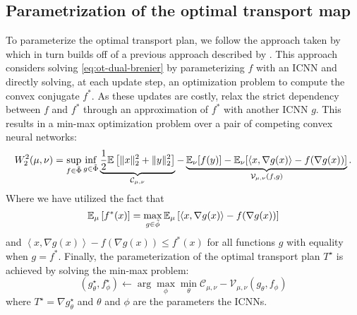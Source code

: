 \subsection{Parametrization of the optimal transport map}
To parameterize the optimal transport plan, we follow the approach taken by \citeauthor{makkuva2020} which 
in turn builds off of a previous approach described by \citet{taghvaei2019}.
This approach considers solving \eqref{eq:ot-dual-brenier} by parameterizing $f$ with an ICNN and directly solving, at each update step, an optimization problem to compute the convex conjugate $f^*$.
As these updates are costly, \citet{makkuva2020} relax the strict dependency between $f$ and $f^*$
through an approximation of $f^*$ with another ICNN $g$.
This results in a min-max optimization problem over a pair of competing convex neural networks:
\begin{equation}
  W_{2}^2(\mu, \nu)=\sup _{\substack{f \in \Tilde{\Phi}}} \inf _{g \in \Tilde{\Phi}}  \underbrace{\frac{1}{2}\mathbb{E}\left[\|x\|_{2}^{2}+\|y\|_{2}^{2}\right]}_{\mathcal{C}_{\mu, \nu}} - \underbrace{\mathbb{E}_{\nu}[f(y)]-\mathbb{E}_{\nu}[\langle x, \nabla g(x)\rangle-f(\nabla g(x))]}_{\mathcal{V}_{\mu, \nu}(f, g)}.
\end{equation}
Where we have utilized the fact that
\begin{equation}
  \mathbb{E}_\mu \left[f^*(x)\right] = \max_{g \in \Tilde{\phi}} \mathbb{E}_\mu \left[ \left<x, \nabla g(x)\right> - f(\nabla g(x))\right]
\end{equation}
and 
$\left<x, \nabla g(x)\right> - f(\nabla g(x)) \leq f^*(x)$ for all functions $g$ with equality when $g=f^*$.
Finally, the parameterization of the optimal transport plan $T^\star$ is achieved by solving the min-max problem:
\begin{equation}
  (g^\star_\theta, f^\star_\phi) \leftarrow \arg \max_\phi \min_\theta \mathcal{C}_{\mu,\nu} - \mathcal{V}_{\mu, \nu}(g_\theta, f_\phi)
\end{equation}
where $T^\star = \nabla g^\star_\theta$ and $\theta$ and $\phi$ are the parameters the ICNNs.



